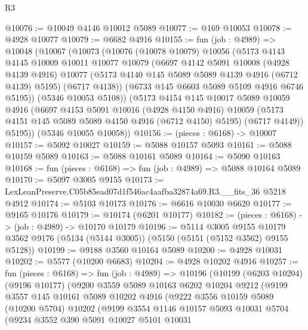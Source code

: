 \begin{lexlean}{R3}
\begin{coremodule}
@10076 := @10049 @4146 @10012 @5089
@10077 := @169 @10053
@10078 := @4928 @10077
@10079 := @6682 @4916
@10155 := fun (job : @4989) =>
  @10048
    (@10067
      (@10073
        (@10076
          (@10078 @10079)
          @10056
          (@5173
            @4143
            @4145
            @10009
            @10011
            @10077
            @10079
            (@6697
              @4142
              @5091
              @10008
              (@4928 @4139 @4916)
              @10077
              (@5173 @4140 @145 @5089 @5089 @4139 @4916 (@6712 @4139) @5195)
              (@6717 @4138))
            (@6733 @145 @6603 @5089 @5109 @4916 @6746 @5195))
          (@5346 @10053 @5108))
        (@5173
          @4154
          @145
          @10017
          @5089
          @10059
          @4916
          (@6697
            @4153
            @5091
            @10016
            (@4928 @4150 @4916)
            @10059
            (@5173 @4151 @145 @5089 @5089 @4150 @4916 (@6712 @4150) @5195)
            (@6717 @4149))
          @5195))
      (@5346 @10055 @10058))
@10156 := (pieces : @6168) -> @10007
@10157 := @5092 @10027
@10159 := @5088 @10157 @5093
@10161 := @5088 @10159 @5089
@10163 := @5088 @10161 @5089
@10164 := @5090 @10163
@10168 := fun (pieces : @6168) => fun (job : @4989) => @5088 @10164 @5089
@10170 := @5097 @3005 @9155
@10173 := LexLeanPreserve.C05b85ead07d1f546ac4aafba32874a69.R3.__fits_36 @5218 @4912
@10174 := @5103 @10173
@10176 := @6616 @10030 @6620
@10177 := @9165 @10176
@10179 := @10174 (@6201 @10177)
@10182 := (pieces : @6168) -> (job : @4989) -> @10170 @10179
@10196 := @5114
    @3005
    @9155
    @10179
    @3562
    @9176
    (@5134 (@5144 @3005))
    (@5150 (@5151 (@5152 @3562) @9155 @5128))
@10199 := @9188 @3560 @10164 @5089
@10200 := @4928 @10031
@10202 := @5577 (@10200 @6683)
@10204 := @4928 @10202 @4916
@10257 := fun (pieces : @6168) =>
  fun (job : @4989) =>
  @10196
    (@10199
      (@6203 @10204)
      (@9196 @10177)
      (@9200
        @3559
        @5089
        @10163
        @6202
        @10204
        @9212
        (@9199
          @3557
          @145
          @10161
          @5089
          @10202
          @4916
          (@9222
            @3556
            @10159
            @5089
            (@10200 @5704)
            @10202
            (@9199
              @3554
              @1146
              @10157
              @5093
              @10031
              @5704
              (@9234
                @3552
                @390
                @5091
                @10027
                @5101
                @10031

\end{coremodule}
\end{lexlean}
